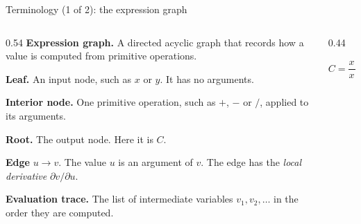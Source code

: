 \documentclass[aspectratio=169,xcolor=dvipsnames,svgnames,x11names,fleqn]{beamer}
\begin{document}
\begin{frame}{Terminology (1 of 2): the expression graph}
\begin{columns}[T]
\begin{column}{0.54\textwidth}
\small
\textbf{Expression graph.} A directed acyclic graph that records how a
value is computed from primitive operations.

\medskip
\textbf{Leaf.} An input node, such as $x$ or $y$. It has no arguments.

\medskip
\textbf{Interior node.} One primitive operation, such as $+$, $-$ or
$/$, applied to its arguments.

\medskip
\textbf{Root.} The output node. Here it is $C$.

\medskip
\textbf{Edge} $u \to v$. The value $u$ is an argument of $v$. The edge
has the \emph{local derivative} $\partial v / \partial u$.

\medskip
\textbf{Evaluation trace.} The list of intermediate variables
$v_1, v_2, \dots$ in the order they are computed.
\end{column}
\begin{column}{0.44\textwidth}
\centering
{}

\medskip
{\small $C = \dfrac{x + y}{x - y}$}
\end{column}
\end{columns}
\end{frame}
\end{document}
